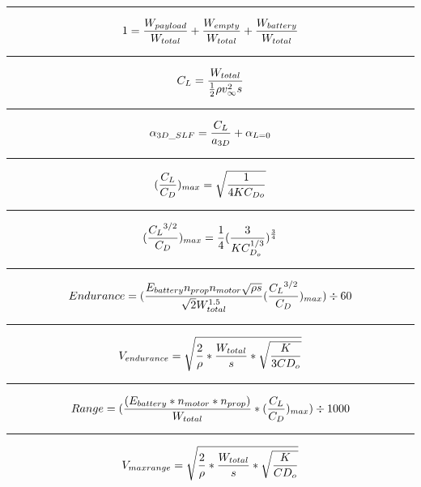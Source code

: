 \documentclass[12pt,A4paper]{article}
\begin{document}
		\hrule
		\vspace{0.1 in}
		\begin{equation}
			1 = \frac{W_{payload}}{W_{total}} + \frac{W_{empty}}{W_{total}} + \frac{W_{battery}}{W_{total}}\\
		\end{equation}
		\hrule
		\vspace{0.1 in}
		\begin{equation}
			C_L = \frac{W_{total}}{\frac{1}{2} \rho  v_\infty^2  s} \\
		\end{equation}
		\hrule
		\vspace{0.1 in}
		\begin{equation}
			\alpha_{3D\_SLF} = \frac{C_L}{a_{3D}}+\alpha_{L=0} \\
		\end{equation}
		\hrule
		\vspace{0.1 in}
		\begin{equation}
			(\frac{C_L}{C_D})_{max} = \sqrt{\frac{1}{4 K C_{D o}}} \\
		\end{equation}
		\hrule
		\vspace{0.1 in}
		\begin{equation}
			(\frac{{C_L}^{3/2}}{C_D})_{max} = \frac{1}{4} (\frac{3}{K C_{D_o}^{1/3}})^{\frac{3}{4}} \\
		\end{equation}
		\hrule
		\vspace{0.1 in}
		\begin{equation}
			Endurance = (\frac{E_{battery} n_{prop} n_{motor} \sqrt{\rho s}}{\sqrt{2} W_{total}^{1.5}} (\frac{{C_L}^{3/2}}{C_D})_{max}) \div 60 \\
		\end{equation}
		\hrule
		\vspace{0.1 in}
		\begin{equation}
			V_{endurance} = \sqrt{\frac{2}{\rho} * \frac{W_{total}}{s} * \sqrt{\frac{K}{3  CD_o}}} \\
		\end{equation}
		\hrule
		\vspace{0.1 in}
		\begin{equation}
			Range = (\frac{(E_{battery} * n_{motor} * n_{prop})}{W_{total}} * (\frac{C_L}{C_D})_{max}) \div 1000 \\
		\end{equation}
		\hrule
		\vspace{0.1 in}
		\begin{equation}
			V_{maxrange} = \sqrt{\frac{2}{\rho} * \frac{W_{total}}{s} * \sqrt{\frac{K}{CD_o}}}\\
		\end{equation}
\end{document}
